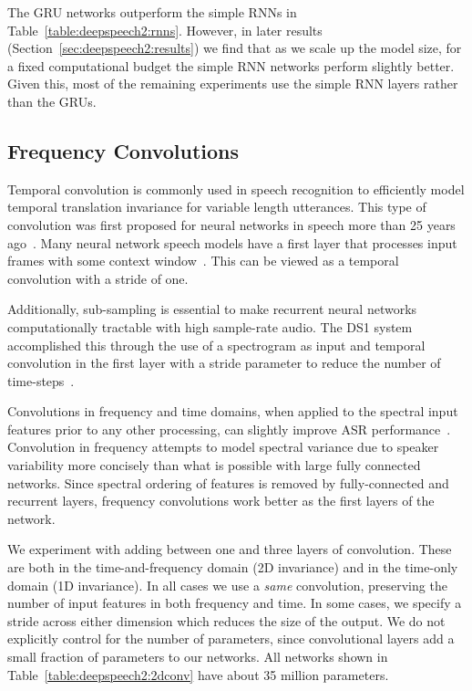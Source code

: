 The GRU networks outperform the simple RNNs in
Table~\ref{table:deepspeech2:rnns}. However, in later results
(Section~\ref{sec:deepspeech2:results}) we find that as we scale up the model
size, for a fixed computational budget the simple RNN networks perform slightly
better.  Given this, most of the remaining experiments use the simple RNN
layers rather than the GRUs.

\subsection{Frequency Convolutions}
\label{sec:deepspeech2:2dconv}

Temporal convolution is commonly used in speech recognition to efficiently
model temporal translation invariance for variable length utterances. This type
of convolution was first proposed for neural networks in speech more than 25
years ago~\cite{waibel1989}. Many neural network speech models have a first
layer that processes input frames with some context window~\cite{dahl2011,
vesely2013}. This can be viewed as a temporal convolution with a stride of one. 

Additionally, sub-sampling is essential to make recurrent neural networks
computationally tractable with high sample-rate audio. The DS1 system
accomplished this through the use of a spectrogram as input and temporal
convolution in the first layer with a stride parameter to reduce the number of
time-steps~\cite{hannun2014deepspeech}.

Convolutions in frequency and time domains, when applied to the spectral input
features prior to any other processing, can slightly improve ASR
performance~\cite{abdelhamid2012, sainath2013deep, soltau2014}. Convolution in
frequency attempts to model spectral variance due to speaker variability more
concisely than what is possible with large fully connected networks. Since
spectral ordering of features is removed by fully-connected and recurrent
layers, frequency convolutions work better as the first layers of the network.

We experiment with adding between one and three layers of convolution. These
are both in the time-and-frequency domain (2D invariance) and in the time-only
domain (1D invariance). In all cases we use a \emph{same} convolution,
preserving the number of input features in both frequency and time. In some
cases, we specify a stride across either dimension which reduces the size of
the output. We do not explicitly control for the number of parameters, since
convolutional layers add a small fraction of parameters to our networks. All
networks shown in Table~\ref{table:deepspeech2:2dconv} have about 35 million
parameters.

